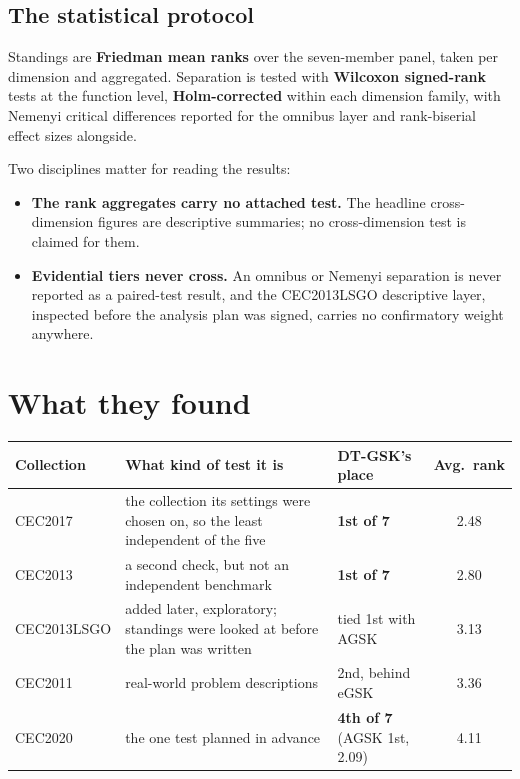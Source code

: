 \documentclass[11pt,a4paper]{article}
\newcommand{\hl}[1]{\textbf{#1}}
\begin{document}
\subsection{The statistical protocol}

Standings are \hl{Friedman mean ranks} over the seven-member panel, taken
per dimension and aggregated. Separation is tested with \hl{Wilcoxon
signed-rank} tests at the function level, \hl{Holm-corrected} within each
dimension family, with Nemenyi critical differences reported for the omnibus
layer and rank-biserial effect sizes alongside.

Two disciplines matter for reading the results:

\begin{itemize}[leftmargin=1.2em, itemsep=2pt, topsep=3pt]
\item \hl{The rank aggregates carry no attached test.} The headline
      cross-dimension figures are descriptive summaries; no cross-dimension
      test is claimed for them.
\item \hl{Evidential tiers never cross.} An omnibus or Nemenyi separation is
      never reported as a paired-test result, and the CEC2013LSGO descriptive
      layer, inspected before the analysis plan was signed, carries no
      confirmatory weight anywhere.
\end{itemize}

\section{What they found}

\begin{center}
\small
\begin{tabular}{@{}p{2.4cm}p{4.95cm}p{3.2cm}c@{}}
\toprule
\textbf{Collection} & \textbf{What kind of test it is} & \textbf{DT-GSK's place} & \textbf{Avg.\ rank} \\
\midrule
CEC2017 & the collection its settings were chosen on, so the least independent of the five & \hl{1st of 7} & 2.48 \\
CEC2013 & a second check, but not an independent benchmark & \hl{1st of 7} & 2.80 \\
CEC2013LSGO & added later, exploratory; standings were looked at before the plan was written & tied 1st with AGSK & 3.13 \\
CEC2011 & real-world problem descriptions & 2nd, behind eGSK & 3.36 \\
CEC2020 & the one test planned in advance & \hl{4th of 7} (AGSK 1st, 2.09) & 4.11 \\
\bottomrule
\end{tabular}
\end{center}
\end{document}
